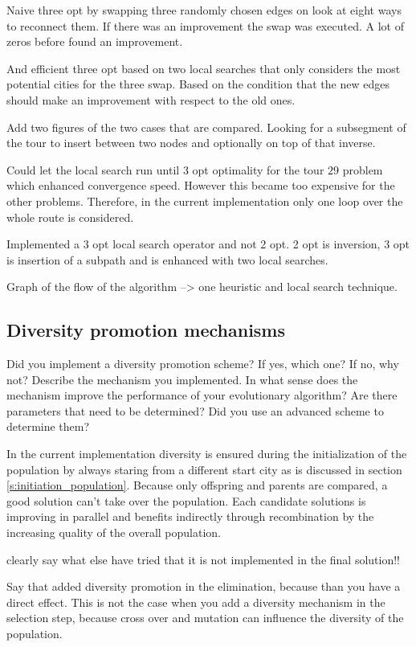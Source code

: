 \documentclass[a4paper,10pt]{article}
\newcommand{\ReplaceMe}[1]{{\color{blue}#1}}
\begin{document}
Naive three opt by swapping three randomly chosen edges on look at eight ways to reconnect them. If there was an improvement the swap was executed. A lot of zeros before found an improvement. 

And efficient three opt based on two local searches that only considers the most potential cities for the three swap. Based on the condition that the new edges should make an improvement with respect to the old ones. 

Add two figures of the two cases that are compared. Looking for a subsegment of the tour to insert between two nodes and optionally on top of that inverse.

Could let the local search run until 3 opt optimality for the tour $29$ problem which enhanced convergence speed. However this became too expensive for the other problems. Therefore, in the current implementation only one loop over the whole route is considered. 

Implemented a 3 opt local search operator and not 2 opt. 2 opt is inversion, 3 opt is insertion of a subpath and is 
enhanced with two local searches. 

Graph of the flow of the algorithm --> one heuristic and local search technique. 

\subsection{Diversity promotion mechanisms}

\ReplaceMe{Did you implement a diversity promotion scheme? If yes, which one? If no, why not? Describe the mechanism you implemented. In what sense does the mechanism improve the performance of your evolutionary algorithm? Are there parameters that need to be determined? Did you use an advanced scheme to determine them?}

In the current implementation diversity is ensured during the initialization of the population by always staring from a different start city as is discussed in section \ref{s:initiation_population}. Because only offspring and parents are compared, a good solution can't take over the population. Each candidate solutions is improving in parallel and benefits indirectly through recombination by the increasing quality of the overall population. 

clearly say what else have tried that it is not implemented in the final solution!!

Say that added diversity promotion in the elimination, because than you have a direct effect. This is not the case when you add a diversity mechanism in the selection step, because cross over and mutation can influence the diversity of the population. 
\end{document}
